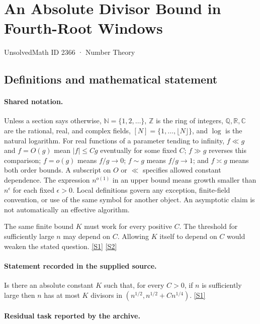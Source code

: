 \documentclass[11pt,a4paper]{article}
\newcommand{\N}{\mathbb{N}}
\newcommand{\Z}{\mathbb{Z}}
\newcommand{\Q}{\mathbb{Q}}
\newcommand{\R}{\mathbb{R}}
\newcommand{\C}{\mathbb{C}}
\newcommand{\sref}[2]{\hyperlink{source:#1:#2}{[S#2]}}
\begin{document}

\setcounter{section}{2365}

\section{An Absolute Divisor Bound in Fourth-Root Windows}\label{2366}

{\small\sffamily UnsolvedMath ID 2366 · Number Theory}

\subsection{Definitions and mathematical statement}

\paragraph{Shared notation.}Unless a section says otherwise, $\N=\{1,2,\ldots\}$,
$\Z$ is the ring of integers, $\Q,\R,\C$ are the rational, real, and complex
fields, $[N]=\{1,\ldots,\lfloor N\rfloor\}$, and $\log$ is the natural
logarithm. For real functions of a parameter tending to infinity,
$f\ll g$ and $f=O(g)$ mean $|f|\leq Cg$ eventually for some fixed $C$;
$f\gg g$ reverses this comparison; $f=o(g)$ means $f/g\to0$;
$f\sim g$ means $f/g\to1$; and $f\asymp g$ means both order bounds.
A subscript on $O$ or $\ll$ specifies allowed constant dependence.
The expression $n^{o(1)}$ in an upper bound means growth smaller than
$n^\epsilon$ for each fixed $\epsilon>0$. Local definitions govern any
exception, finite-field convention, or use of the same symbol for another
object. An asymptotic claim is not automatically an effective algorithm.



The same finite bound $K$ must work for every positive $C$. The threshold for sufficiently large $n$ may depend on $C$. Allowing $K$ itself to depend on $C$ would weaken the stated question. \sref{2366}{1} \sref{2366}{2}

\paragraph{Statement recorded in the supplied source.}
Is there an absolute constant $K$ such that, for every $C>0$, if $n$ is sufficiently large then $n$ has at most $K$ divisors in $(n^{1/2},n^{1/2}+C n^{1/4})$. \sref{2366}{1}

\paragraph{Residual task reported by the archive.}
\end{document}
